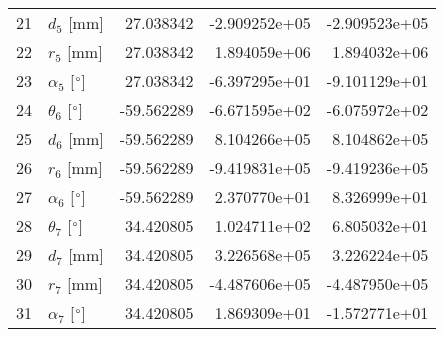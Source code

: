 \documentclass{standalone}%
\begin{document}
\begin{tabular}{llrrr}
21 &              $d_{5}$ [mm] &  27.038342 & -2.909252e+05 & -2.909523e+05 \\
22 &              $r_{5}$ [mm] &  27.038342 &  1.894059e+06 &  1.894032e+06 \\
23 &  $\alpha_{5}$ [$\degree$] &  27.038342 & -6.397295e+01 & -9.101129e+01 \\
24 &  $\theta_{6}$ [$\degree$] & -59.562289 & -6.671595e+02 & -6.075972e+02 \\
25 &              $d_{6}$ [mm] & -59.562289 &  8.104266e+05 &  8.104862e+05 \\
26 &              $r_{6}$ [mm] & -59.562289 & -9.419831e+05 & -9.419236e+05 \\
27 &  $\alpha_{6}$ [$\degree$] & -59.562289 &  2.370770e+01 &  8.326999e+01 \\
28 &  $\theta_{7}$ [$\degree$] &  34.420805 &  1.024711e+02 &  6.805032e+01 \\
29 &              $d_{7}$ [mm] &  34.420805 &  3.226568e+05 &  3.226224e+05 \\
30 &              $r_{7}$ [mm] &  34.420805 & -4.487606e+05 & -4.487950e+05 \\
31 &  $\alpha_{7}$ [$\degree$] &  34.420805 &  1.869309e+01 & -1.572771e+01 \\
\bottomrule
\end{tabular}
%
\end{document}
